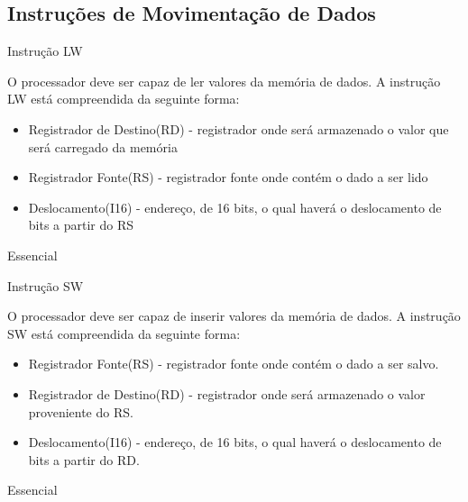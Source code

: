 \documentclass{article}
\begin{document}
  \subsection{Instruções de Movimentação de Dados}
    \begin{functional}
     \requirement
      {Instrução LW}
      {O processador deve ser capaz de ler valores da memória de dados.
       A instrução LW está compreendida da seguinte forma:
       \begin{itemize}
        \item Registrador de Destino(RD) - registrador onde será armazenado o valor que será carregado da memória
        \item Registrador Fonte(RS) - registrador fonte onde contém o dado a ser lido
        \item Deslocamento(I16) - endereço, de 16 bits, o qual haverá o deslocamento de bits a partir do RS
       \end{itemize}
       }
      {Essencial}

     \requirement
      {Instrução SW}
      {O processador deve ser capaz de inserir valores da memória de dados.
      A instrução SW está compreendida da seguinte forma:
       \begin{itemize}
        \item Registrador Fonte(RS) - registrador fonte onde contém o dado a ser salvo.
        \item Registrador de Destino(RD) - registrador onde será armazenado o valor proveniente do RS.
        \item Deslocamento(I16) - endereço, de 16 bits, o qual haverá o deslocamento de bits a partir do RD.
       \end{itemize}
       }
      {Essencial}
    \end{functional}
\end{document}
